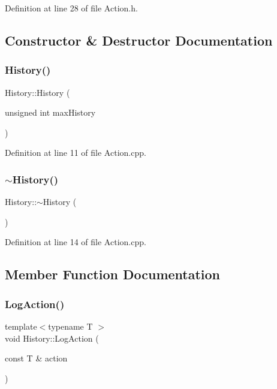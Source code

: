 Definition at line 28 of file Action.\+h.



\subsection{Constructor \& Destructor Documentation}
\mbox{\label{class_history_afa52e652306d81e61acce4f6ebb9a04d}} 
\subsubsection{\texorpdfstring{History()}{History()}}
{\footnotesize\ttfamily History\+::\+History (\begin{DoxyParamCaption}\item[{unsigned int}]{max\+History }\end{DoxyParamCaption})}



Definition at line 11 of file Action.\+cpp.

\mbox{\label{class_history_a5b00b64a1ddee04e60d5a3b517fd6d4c}} 
\subsubsection{\texorpdfstring{$\sim$\+History()}{~History()}}
{\footnotesize\ttfamily History\+::$\sim$\+History (\begin{DoxyParamCaption}{ }\end{DoxyParamCaption})}



Definition at line 14 of file Action.\+cpp.



\subsection{Member Function Documentation}
\mbox{\label{class_history_ae2286b5c19bc1a5947caf33bdc5a39b0}} 
\subsubsection{\texorpdfstring{Log\+Action()}{LogAction()}}
{\footnotesize\ttfamily template$<$typename T $>$ \\
void History\+::\+Log\+Action (\begin{DoxyParamCaption}\item[{const T \&}]{action }\end{DoxyParamCaption})\hspace{0.3cm}{\ttfamily [inline]}}



